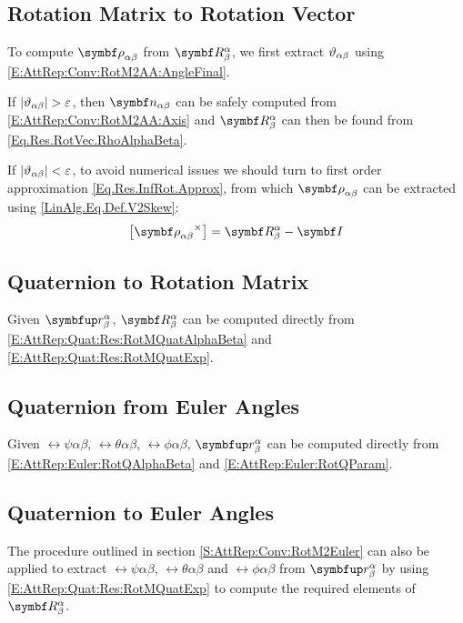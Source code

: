 \subsection{Rotation Matrix to Rotation Vector}
To compute $\rotv[]{\alpha}{\beta}$ from $\RotM{\alpha}{\beta}$, we first extract $\vartheta_{\alpha \beta}$ using \eqref{E:AttRep:Conv:RotM2AA:AngleFinal}.

If $|\vartheta_{\alpha \beta}| > \varepsilon$, then $\vrel{\rotax}{\alpha}{\beta}$ can be safely computed from \eqref{E:AttRep:Conv:RotM2AA:Axis} and $\RotM{\alpha}{\beta}$ can then be found from \eqref{Eq.Res.RotVec.RhoAlphaBeta}.

If $|\vartheta_{\alpha \beta}| < \varepsilon$, to avoid numerical issues we should turn to first order approximation \eqref{Eq.Res.InfRot.Approx}, from which $\rotv[]{\alpha}{\beta}$ can be extracted using \eqref{LinAlg.Eq.Def.V2Skew}:
\begin{equation*}
	\vskew{\rotv[]{\alpha}{\beta}} = \RotM{\alpha}{\beta} - \IdM \\
\end{equation*}

\subsection{Quaternion to Rotation Matrix}
Given $\RotQ{\alpha}{\beta}$, $\RotM{\alpha}{\beta}$ can be computed directly from \eqref{E:AttRep:Quat:Res:RotMQuatAlphaBeta} and \eqref{E:AttRep:Quat:Res:RotMQuatExp}.

\subsection{Quaternion from Euler Angles}
Given $\rel{\psi}{\alpha}{\beta}$, $\rel{\theta}{\alpha}{\beta}$, $\rel{\phi}{\alpha}{\beta}$, $\RotQ{\alpha}{\beta}$ can be computed directly from \eqref{E:AttRep:Euler:RotQAlphaBeta} and \eqref{E:AttRep:Euler:RotQParam}.

\subsection{Quaternion to Euler Angles}
The procedure outlined in section \ref{S:AttRep:Conv:RotM2Euler} can also be applied to extract $\rel{\psi}{\alpha}{\beta}$, $\rel{\theta}{\alpha}{\beta}$ and $\rel{\phi}{\alpha}{\beta}$ from $\RotQ{\alpha}{\beta}$ by using \eqref{E:AttRep:Quat:Res:RotMQuatExp} to compute the required elements of $\RotM{\alpha}{\beta}$.

